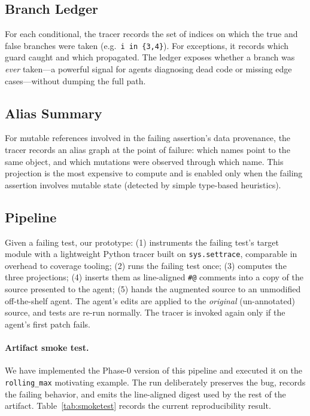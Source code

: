 \documentclass[sigconf,review,anonymous,nonacm]{acmart}
\begin{document}
\subsection{Branch Ledger}
For each conditional, the tracer records the set of indices on which the
true and false branches were taken (e.g.\ \verb|i in {3,4}|). For
exceptions, it records which guard caught and which propagated. The ledger
exposes whether a branch was \emph{ever} taken---a powerful signal for
agents diagnosing dead code or missing edge cases---without dumping the
full path.

\subsection{Alias Summary}
For mutable references involved in the failing assertion's data
provenance, the tracer records an alias graph at the point of failure:
which names point to the same object, and which mutations were observed
through which name. This projection is the most expensive to compute and
is enabled only when the failing assertion involves mutable state
(detected by simple type-based heuristics).

\subsection{Pipeline}
Given a failing test, our prototype: (1) instruments the failing test's
target module with a lightweight Python tracer built on
\verb|sys.settrace|, comparable in overhead to coverage tooling; (2) runs
the failing test once; (3) computes the three projections; (4) inserts
them as line-aligned \verb|#@| comments into a copy of the source presented
to the agent; (5) hands the augmented source to an unmodified off-the-shelf
agent. The agent's edits are applied to the \emph{original} (un-annotated)
source, and tests are re-run normally. The tracer is invoked again only if
the agent's first patch fails.

\paragraph{Artifact smoke test.} We have implemented the Phase-0 version
of this pipeline and executed it on the \verb|rolling_max| motivating
example. The run deliberately preserves the bug, records the failing
behavior, and emits the line-aligned digest used by the rest of the
artifact. Table~\ref{tab:smoketest} records the current reproducibility
result.
\end{document}
